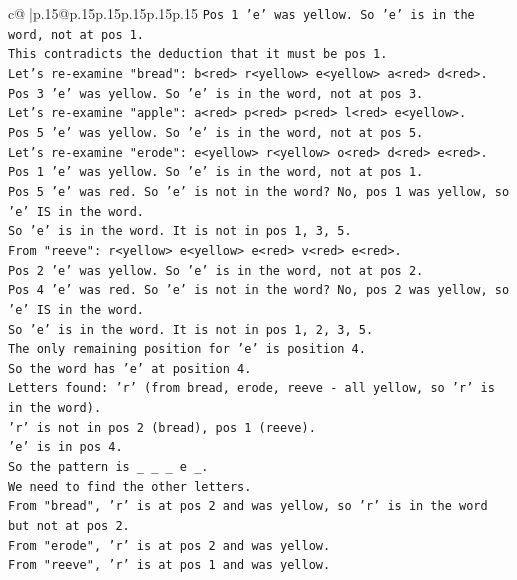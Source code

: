 \documentclass{article}
\begin{document}
{\begin{supertabular}{c@{$\;$}|p{.15\linewidth}@{}p{.15\linewidth}p{.15\linewidth}p{.15\linewidth}p{.15\linewidth}p{.15\linewidth}}
{{{\texttt{Pos 1 'e' was yellow. So 'e' is in the word, not at pos 1.} \\
\texttt{This contradicts the deduction that it must be pos 1.} \\
\texttt{Let's re{-}examine "bread": b<red> r<yellow> e<yellow> a<red> d<red>.} \\
\texttt{Pos 3 'e' was yellow. So 'e' is in the word, not at pos 3.} \\
\texttt{Let's re{-}examine "apple": a<red> p<red> p<red> l<red> e<yellow>.} \\
\texttt{Pos 5 'e' was yellow. So 'e' is in the word, not at pos 5.} \\
\texttt{Let's re{-}examine "erode": e<yellow> r<yellow> o<red> d<red> e<red>.} \\
\texttt{Pos 1 'e' was yellow. So 'e' is in the word, not at pos 1.} \\
\texttt{Pos 5 'e' was red. So 'e' is not in the word? No, pos 1 was yellow, so 'e' IS in the word.} \\
\texttt{So 'e' is in the word. It is not in pos 1, 3, 5.} \\
\texttt{From "reeve": r<yellow> e<yellow> e<red> v<red> e<red>.} \\
\texttt{Pos 2 'e' was yellow. So 'e' is in the word, not at pos 2.} \\
\texttt{Pos 4 'e' was red. So 'e' is not in the word? No, pos 2 was yellow, so 'e' IS in the word.} \\
\texttt{So 'e' is in the word. It is not in pos 1, 2, 3, 5.} \\
\texttt{The only remaining position for 'e' is position 4.} \\
\texttt{So the word has 'e' at position 4.} \\
\texttt{Letters found: 'r' (from bread, erode, reeve {-} all yellow, so 'r' is in the word).} \\
\texttt{'r' is not in pos 2 (bread), pos 1 (reeve).} \\
\texttt{'e' is in pos 4.} \\
\texttt{So the pattern is \_ \_ \_ e \_.} \\
\texttt{We need to find the other letters.} \\
\texttt{From "bread", 'r' is at pos 2 and was yellow, so 'r' is in the word but not at pos 2.} \\
\texttt{From "erode", 'r' is at pos 2 and was yellow.} \\
\texttt{From "reeve", 'r' is at pos 1 and was yellow.} \\
}}}
\end{supertabular}}
\end{document}
